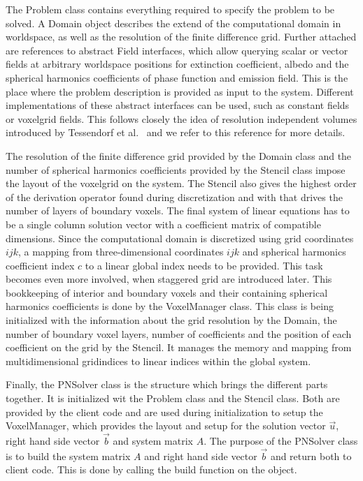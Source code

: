 The Problem class contains everything required to specify the problem to be solved. A Domain object describes the extend of the computational domain in worldspace, as well as the resolution of the finite difference grid. Further attached are references to abstract Field interfaces, which allow querying scalar or vector fields at arbitrary worldspace positions for extinction coefficient, albedo and the spherical harmonics coefficients of phase function and emission field. This is the place where the problem description is provided as input to the system. Different implementations of these abstract interfaces can be used, such as constant fields or voxelgrid fields. This follows closely the idea of resolution independent volumes introduced by Tessendorf et al.~\cite{Tessendorf11} and we refer to this reference for more details.

The resolution of the finite difference grid provided by the Domain class and the number of spherical harmonics coefficients provided by the Stencil class impose the layout of the voxelgrid on the system. The Stencil also gives the highest order of the derivation operator found during discretization and with that drives the number of layers of boundary voxels. The final system of linear equations has to be a single column solution vector with a coefficient matrix of compatible dimensions. Since the computational domain is discretized using grid coordinates $ijk$, a mapping from three-dimensional coordinates $ijk$ and spherical harmonics coefficient index $c$ to a linear global index needs to be provided. This task becomes even more involved, when staggered grid are introduced later. This bookkeeping of interior and boundary voxels and their containing spherical harmonics coefficients is done by the VoxelManager class. This class is being initialized with the information about the grid resolution by the Domain, the number of boundary voxel layers, number of coefficients and the position of each coefficient on the grid by the Stencil. It manages the memory and mapping from multidimensional gridindices to linear indices within the global system.

Finally, the PNSolver class is the structure which brings the different parts together. It is initialized wit the Problem class and the Stencil class. Both are provided by the client code and are used during initialization to setup the VoxelManager, which provides the layout and setup for the solution vector $\vec{u}$, right hand side vector $\vec{b}$ and system matrix $A$. The purpose of the PNSolver class is to build the system matrix $A$ and right hand side vector $\vec{b}$ and return both to client code. This is done by calling the build function on the object.

